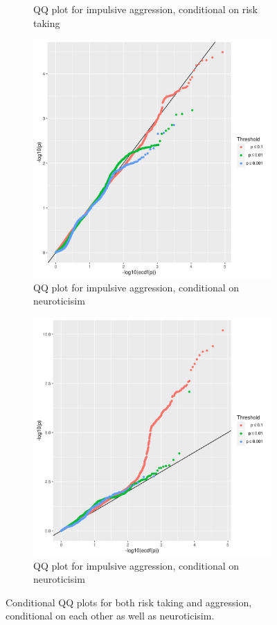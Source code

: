 \begin{figure}[!htpb]
\begin{subfigure}{0.4\textwidth}
		\caption{QQ plot for impulsive aggression, conditional on risk taking\label{fig:cFDR_agg}}
	\end{subfigure}
	\begin{subfigure}{0.4\textwidth}
		\centering
    \includegraphics[width=0.9\linewidth]{ukb_assoc/figure/cFDR/aggresion_neuro.jpeg}
    \caption{QQ plot for impulsive aggression, conditional on neuroticisim\label{fig:cFDR_agg+neuro}}
	\end{subfigure}
	\begin{subfigure}{0.4\textwidth}
		\centering
    \includegraphics[width=0.9\linewidth]{ukb_assoc/figure/cFDR/risk_neuro.jpeg}
		\caption{QQ plot for impulsive aggression, conditional on neuroticisim\label{fig:cFDR_agg+neuro}}
	\end{subfigure}
  \caption{Conditional QQ plots for both risk taking and aggression, conditional on each other as well as neuroticisim.\label{fig:cFDR}}
\end{figure}

